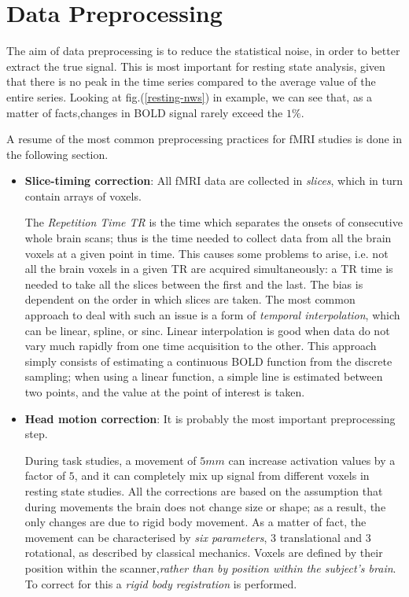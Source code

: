 \documentclass[12pt,openright,twoside,a4paper]{book}
\begin{document}
\section{Data Preprocessing}

The aim of data preprocessing is to reduce the statistical noise, in order to better extract the true signal.
This is most important for resting state analysis, given that there is no peak in the time series compared to the average value of the entire series. 
Looking at fig.(\ref{resting-nws}) in example, we can see that, as a matter of facts,changes in BOLD signal rarely exceed the $1\%$.

A resume of the most common preprocessing practices for fMRI studies is done in the following section.

\begin{itemize}
\item \textbf{Slice-timing correction}: All fMRI data are collected in \textit{slices}, which in turn contain arrays of voxels. 

The \textit{Repetition Time TR} is the time which separates the onsets of consecutive whole brain scans; thus is the time needed to collect data from all the brain voxels at a given point in time. 
This causes some problems to arise, i.e. not all the brain voxels in a given TR are acquired simultaneously: a TR time is needed to take all the slices between the first and the last. 
The bias is dependent on the order in which slices are taken. 
The most common approach to deal with such an issue is a form of \textit{temporal interpolation}, which can be linear, spline, or sinc. 
Linear interpolation is good when data do not vary much rapidly from one time acquisition to the other. This approach simply consists of estimating a continuous BOLD function from the discrete sampling; when using a linear function, a simple line is estimated between
two points, and the value at the point of interest is taken.

\item \textbf{Head motion correction}: It is probably the most important preprocessing step.

During task studies,  a movement of $5mm$ can increase activation values by a factor of $5$, and it can completely mix up signal from different voxels in resting state studies.
All the corrections are based on the assumption that during movements the brain does not change size or shape; as a result, the only changes are due to rigid body movement. 
 As a matter of fact, the movement can be characterised by \textit{six parameters}, 3 translational and 3 rotational, as described by classical mechanics. 
 Voxels are defined by their position within the scanner,\textit{rather than by position within the subject’s brain}. 
To correct for this a \textit{rigid body registration} is performed.


\end{itemize}
\end{document}
